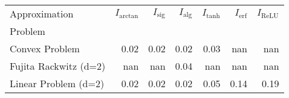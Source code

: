 \begin{tabular}{lrrrrrr}
Approximation & $I_\text{arctan}$ & $I_\text{sig}$ & $I_\text{alg}$ & $I_\text{tanh}$ & $I_\text{erf}$ & $I_\text{ReLU}$ \\
Problem &  &  &  &  &  &  \\
Convex Problem & 0.02 & 0.02 & 0.02 & 0.03 & nan & nan \\
\cline{1-7}
Fujita Rackwitz (d=2) & nan & nan & 0.04 & nan & nan & nan \\
\cline{1-7}
Linear Problem (d=2) & 0.02 & 0.02 & 0.02 & 0.05 & 0.14 & 0.19 \\
\cline{1-7}
\end{tabular}
